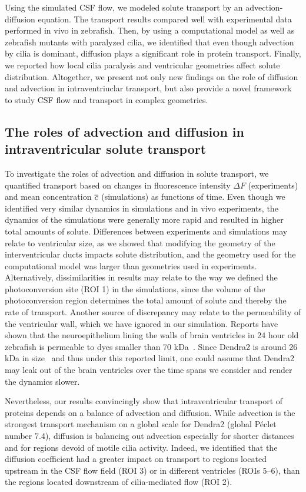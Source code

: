 \documentclass{WileyMSP-template}
\begin{document}
Using the simulated CSF flow, we modeled solute transport by an advection-diffusion equation.
The transport results compared well with experimental data performed in vivo in zebrafish.
Then, by using a computational model as well as zebrafish mutants with paralyzed cilia,
we identified that even though advection by cilia is dominant,
diffusion plays a significant role in protein transport.
Finally, we reported how local cilia paralysis and ventricular geometries
affect solute distribution. Altogether, we present not only new findings on the role of
diffusion and advection in intraventriuclar transport, but also provide a novel framework to
study CSF flow and transport in complex geometries.

\subsection{The roles of advection and diffusion in intraventricular solute transport}
To investigate the roles of advection and diffusion in solute transport, we quantified transport
based on changes in fluorescence intensity $\Delta F$ (experiments) and
mean concentration $\overline{c}$ (simulations) as functions of time.
Even though we identified very similar dynamics in simulations and
in vivo experiments, the dynamics of the simulations were generally
more rapid and resulted in higher total amounts of solute.
Differences between experiments and simulations may relate to
ventricular size, as we showed that modifying the geometry of the interventricular ducts
impacts solute distribution, and the geometry used for the computational model was larger
than geometries used in experiments. Alternatively, dissimilarities in results may relate
to the way we defined the photoconversion site (ROI 1) in the simulations,
since the volume of the photoconversion region determines
the total amount of solute and thereby the rate of transport. Another source
of discrepancy may relate to the permeability of the ventricular wall,
which we have ignored in our simulation. Reports have shown that the
neuroepithelium lining the walls of brain ventricles in 24 hour old zebrafish
is permeable to dyes smaller than 70 kDa~\cite{Chang2012AnNeuroepithelium}.
Since Dendra2 is around 26 kDa in size~\cite{Gurskaya2006EngineeringLight} and
thus under this reported limit, one could assume that Dendra2 may
leak out of the brain ventricles over the time spans we consider
and render the dynamics slower.

Nevertheless, our results convincingly show that
intraventricular transport of proteins depends on a balance of advection and diffusion.
While advection is the strongest transport mechanism on a global scale for
Dendra2 (global Péclet number 7.4), diffusion is balancing out
advection especially for shorter distances and for regions devoid of motile cilia activity.
Indeed, we identified that the diffusion coefficient had a greater impact on transport to
regions located upstream in the CSF flow field (ROI 3) or in different ventricles (ROIs 5--6),
than the regions located downstream of cilia-mediated flow (ROI 2). 
\end{document}
